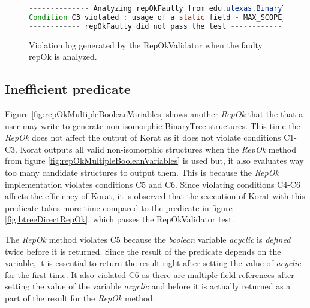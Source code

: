\begin{figure}
\centering
\begin{lstlisting}[language=Java]
-------------- Analyzing repOkFaulty from edu.utexas.BinaryTree ------------
Condition C3 violated : usage of a static field - MAX_SCOPE_PARAM from class edu.utexas.BinaryTree$Settings at line 54 inside repOKEfficient in edu.utexas.BinaryTree
------------ repOkFaulty did not pass the test ------------
\end{lstlisting}
\caption{Violation log generated by the RepOkValidator when the faulty repOk is analyzed.}
\label{fig:repOkKoratSatisfyCorrectnessLog}
\end{figure}

\subsection{Inefficient predicate}
\label{sec:inefficient-predicate}
Figure \ref{fig:repOkMultipleBooleanVariables} shows another
\emph{RepOk} that the that a user may write to generate non-isomorphic
BinaryTree structures. This time the \emph{RepOk} does not affect the
output of Korat as it does not violate conditions C1-C3. Korat outputs
all valid non-isomorphic structures when the \emph{RepOk} method from
figure \ref{fig:repOkMultipleBooleanVariables} is used but, it also
evaluates way too many candidate structures to output them. This is
because the \emph{RepOk} implementation violates conditions C5 and
C6. Since violating conditions C4-C6 affects the efficiency of Korat,
it is observed that the execution of Korat with this predicate takes
more time compared to the predicate in figure
\ref{fig:btreeDirectRepOk}, which passes the RepOkValidator test.

\para The \emph{RepOk} method violates C5 because the \emph{boolean}
variable \emph{acyclic} is \emph{defined} twice before it is
returned. Since the result of the predicate depends on the variable,
it is essential to return the result right after setting the value of
\emph{acyclic} for the first time. It also violated C6 as there are
multiple field references after setting the value of the variable
\emph{acyclic} and before it is actually returned as a part of the
result for the \emph{RepOk} method.

